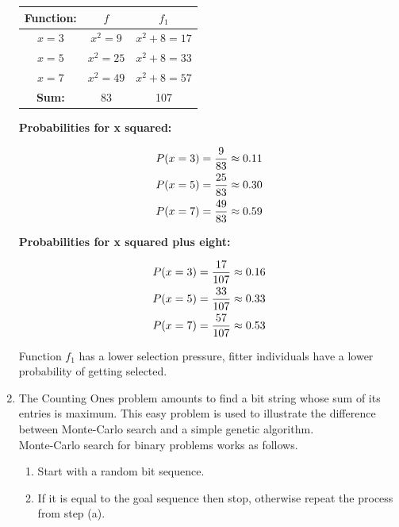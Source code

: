 \documentclass[a4paper]{article}
\begin{document}
\begin{enumerate}
\begin{table}[H]
\centering
\begin{tabular}{|c|c|c|}
\hline
\textbf{Function:} & $f$  & $f_1$ \\ \hline
$x = 3$ & $x^2 = 9$ & $x^2 + 8 = 17$ \\ \hline
$x = 5$ & $x^2 = 25$ & $x^2 + 8 = 33$ \\ \hline
$x = 7$ & $x^2 = 49$ & $x^2 + 8 = 57$ \\ \hline
\textbf{Sum:} & 83 & 107 \\ \hline
\end{tabular}
\end{table}


\textbf{Probabilities for x squared:}	
	
\begin{align*}
P(x = 3) &= \frac{9}{83} \approx 0.11\notag\\
P(x = 5) &= \frac{25}{83} \approx 0.30\notag\\
P(x = 7) &= \frac{49}{83} \approx 0.59\notag
\end{align*}	
	
\textbf{Probabilities for x squared plus eight:}	

\begin{align*}
P(x = 3) &= \frac{17}{107} \approx 0.16\notag\\
P(x = 5) &= \frac{33}{107} \approx 0.33\notag\\
P(x = 7) &= \frac{57}{107} \approx 0.53\notag
\end{align*}	

Function $f_1$ has a lower selection pressure, fitter individuals have a lower probability of getting selected.\\

	\item The Counting Ones problem amounts to find a bit string whose sum of its entries is maximum. This easy problem is used to illustrate the difference between Monte-Carlo search and a simple genetic algorithm.\\
	Monte-Carlo search for binary problems works as follows.
	
	\begin{enumerate}
		\item Start with a random bit sequence.
		\item If it is equal to the goal sequence then stop, otherwise repeat the process from step (a).
	\end{enumerate}
	

\end{enumerate}
\end{document}
